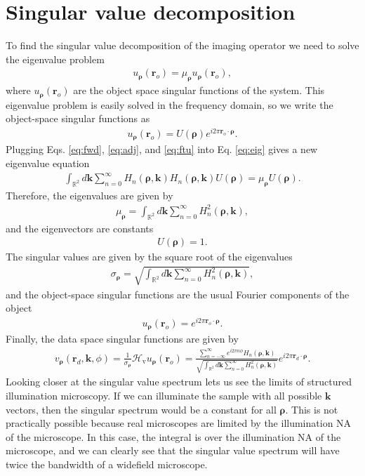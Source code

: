 \documentclass[11pt]{article}
\providecommand{\mb}[1]{\mathbf{#1}}
\providecommand{\mc}[1]{\mathcal{#1}}
\providecommand{\ro}[1]{\mathbf{r}_o}
\providecommand{\rd}[1]{\mathbf{r}_d}
\providecommand{\mbb}[1]{\mathbb{#1}}
\providecommand{\bs}[1]{\boldsymbol{#1}}
\begin{document}
\section{Singular value decomposition}
To find the singular value decomposition of the imaging operator we need to
solve the eigenvalue problem
\begin{align}
  [\mc{H}^{\dagger}\mc{H}]u_{\bs{\rho}}(\ro{}) = \mu_{\bs{\rho}}u_{\bs{\rho}}(\ro{}), \label{eq:eig}
\end{align}
where $u_{\bs{\rho}}(\ro{})$ are the object space singular functions of the
system. This eigenvalue problem is easily solved in the frequency domain, so we
write the object-space singular functions as
\begin{align}
  u_{\bs{\rho}}(\ro{}) = U(\bs{\rho})e^{i2\pi\ro{}\cdot\bs{\rho}}. \label{eq:ftu}
\end{align}
Plugging Eqs. \ref{eq:fwd}, \ref{eq:adj}, and \ref{eq:ftu} into Eq. \ref{eq:eig}
gives a new eigenvalue equation
\begin{align}
  \int_{\mbb{R}^2}d\mb{k}\sum_{n = 0}^{\infty}H_{n}(\bs{\rho}, \mb{k})H_{n}(\bs{\rho}, \mb{k})U(\bs{\rho}) = \mu_{\bs{\rho}}U(\bs{\rho}).
\end{align}
Therefore, the eigenvalues are given by
\begin{align}
  \mu_{\bs{\rho}} = \int_{\mbb{R}^2}d\mb{k}\sum_{n = 0}^{\infty}H^2_{n}(\bs{\rho}, \mb{k}),
\end{align}
and the eigenvectors are constants
\begin{align}
  U(\bs{\rho}) = 1. 
\end{align}
The singular values are given by the square root of the eigenvalues
\begin{align}
  \sigma_{\bs{\rho}} = \sqrt{\int_{\mbb{R}^2}d\mb{k}\sum_{n = 0}^{\infty}H^2_{n}(\bs{\rho}, \mb{k})},
\end{align}
and the object-space singular functions are the usual Fourier components of the
object
\begin{align}
  u_{\bs{\rho}}(\ro{}) = e^{i2\pi\ro{}\cdot\bs{\rho}}. 
\end{align}
Finally, the data space singular functions are given by
\begin{align}
  v_{\bs{\rho}}(\rd{}, \mb{k}, \phi) =\frac{1}{\sigma_{\bs{\rho}}}\mc{H}_{\text{v}}u_{\bs{\rho}}(\ro{}) = \frac{\sum_{n=-\infty}^{\infty}e^{i2\pi n\phi} H_{n}(\bs{\rho}, \mb{k})}{\sqrt{\int_{\mbb{R}^2}d\mb{k}\sum_{n = 0}^{\infty}H^2_{n}(\bs{\rho}, \mb{k})}}e^{i2\pi\rd{}\cdot\bs{\rho}}.
\end{align}
Looking closer at the singular value spectrum lets us see the limits of
structured illumination microscopy. If we can illuminate the sample with all
possible $\mb{k}$ vectors, then the singular spectrum would be a constant for
all $\bs{\rho}$. This is not practically possible because real microscopes are
limited by the illumination NA of the microscope. In this case, the integral is
over the illumination NA of the microscope, and we can clearly see that the
singular value spectrum will have twice the bandwidth of a widefield microscope.
\end{document}
